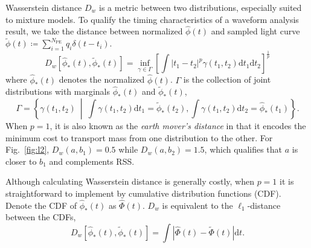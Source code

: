 Wasserstein distance $D_w$ is a metric between two distributions, especially suited to mixture models. To qualify the timing characteristics of a waveform analysis result, we take the distance between normalized $\hat{\phi}(t)$ and sampled light curve $\tilde{\phi}(t)\coloneqq \sum_{i=1}^{N_\mathrm{PE}}q_i\delta(t-t_i)$.
\begin{equation}
  D_w\left[\hat{\phi}_*(t), \tilde{\phi}_*(t)\right] = \inf_{\gamma \in \Gamma} \left[\int \left\vert t_1 - t_2 \right\vert^p \gamma(t_1, t_2)\mathrm{d}t_1\mathrm{d}t_2\right]^{\frac{1}{p}}
\end{equation}
where $\hat{\phi}_*(t)$ denotes the normalized $\hat{\phi}(t)$. $\Gamma$ is the collection of joint distributions with marginals $\hat{\phi}_*(t)$ and $\tilde{\phi}_*(t)$,
\begin{equation*}
  \label{eq:joint}
  \Gamma = \left\{\gamma(t_1, t_2) ~\middle\vert~ \int\gamma(t_1,t_2)\mathrm{d}t_1 = \tilde{\phi}_*(t_2) , \int\gamma(t_1,t_2)\mathrm{d}t_2 = \hat{\phi}_*(t_1)  \right\}.
\end{equation*}
When $p=1$, it is also known as the \textit{earth mover's distance} in that it encodes the minimum cost to transport mass from one distribution to the other.
For Fig.~\ref{fig:l2}, $D_w(a, b_1) = 0.5$ while $D_w(a, b_2) = 1.5$, which qualifies that $a$ is closer to $b_1$ and complements RSS.

Although calculating Wasserstein distance is generally costly, when $p=1$ it is straightforward to implement by cumulative distribution functions (CDF).  Denote the CDF of $\hat{\phi}_*(t)$ as $\hat\Phi(t)$.  $D_w$ is equivalent to the $\ell_1$-distance between the CDFs,
\begin{equation}
    D_w\left[\hat{\phi}_*(t), \tilde{\phi}_*(t)\right] = \int\left|\hat{\Phi}(t) - \tilde{\Phi}(t)\right| \mathrm{d}t.
    \label{eq:numerical}
\end{equation}

